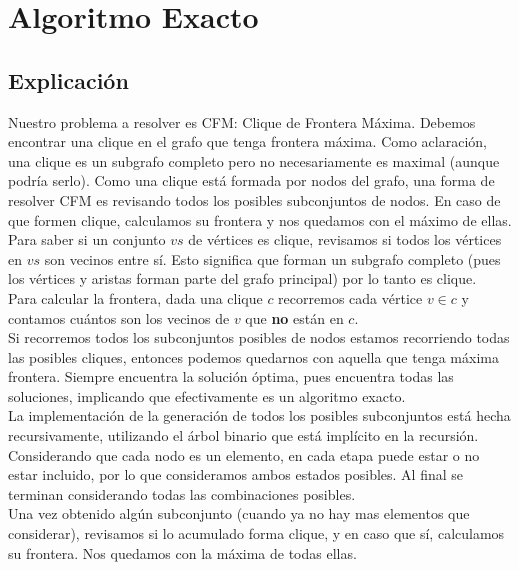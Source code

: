 
\section{Algoritmo Exacto}

\subsection{Explicación}

Nuestro problema a resolver es CFM: Clique de Frontera Máxima. Debemos encontrar una clique en el grafo que tenga frontera máxima. Como aclaración, una clique es un subgrafo completo pero no necesariamente es maximal (aunque podría serlo). Como una clique está formada por nodos del grafo, una forma de resolver CFM es revisando todos los posibles subconjuntos de nodos. En caso de que formen clique, calculamos su frontera y nos quedamos con el máximo de ellas.  \\

Para saber si un conjunto $vs$ de vértices es clique, revisamos si todos los vértices en $vs$ son vecinos entre sí. Esto significa que forman un subgrafo completo (pues los vértices y aristas forman parte del grafo principal) por lo tanto es clique. \\

Para calcular la frontera, dada una clique $c$ recorremos cada vértice $v \in c$ y contamos cuántos son los vecinos de $v$ que \textbf{no} están en $c$. \\

Si recorremos todos los subconjuntos posibles de nodos estamos recorriendo todas las posibles cliques, entonces podemos quedarnos con aquella que tenga máxima frontera. Siempre encuentra la solución óptima, pues encuentra todas las soluciones, implicando que efectivamente es un algoritmo exacto. \\

La implementación de la generación de todos los posibles subconjuntos está hecha recursivamente, utilizando el árbol binario que está implícito en la recursión. Considerando que cada nodo es un elemento, en cada etapa puede estar o no estar incluido, por lo que consideramos ambos estados posibles. Al final se terminan considerando todas las combinaciones posibles. \\

Una vez obtenido algún subconjunto (cuando ya no hay mas elementos que considerar), revisamos si lo acumulado forma clique, y en caso que sí, calculamos su frontera. Nos quedamos con la máxima de todas ellas. \\

